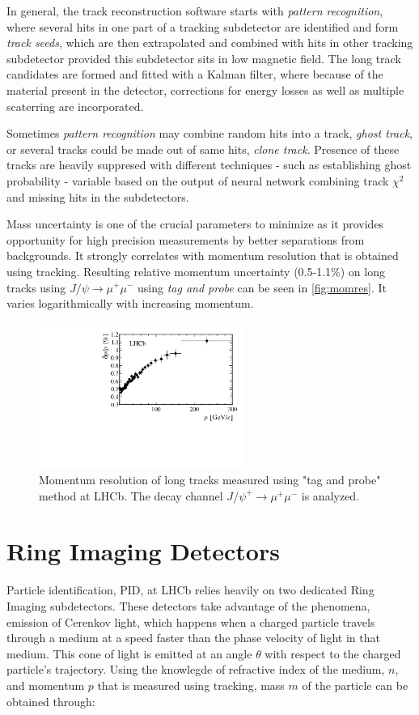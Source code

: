 In general, the track reconstruction software starts with \textit{pattern recognition}, where several hits in one part of a tracking subdetector are identified and form \textit{track seeds}, which are then extrapolated and combined with hits in other tracking subdetector provided this subdetector sits in low magnetic field. The long track candidates are formed and fitted with a Kalman filter\cite{Hierk:684697}, where because of the material present in the detector, corrections for energy losses as well as multiple scaterring are incorporated.

Sometimes \textit{pattern recognition} may combine random hits into a track, \textit{ghost track}, or several tracks could be made out of same hits, \textit{clone track}. Presence of these tracks are heavily suppresed with different techniques - such as establishing ghost probability - variable based on the output of neural network combining track $\chi^{2}$ and missing hits in the subdetectors.

Mass uncertainty is one of the crucial parameters to minimize as it provides opportunity for high precision measurements by better separations from backgrounds. It strongly correlates with momentum resolution that is obtained using tracking. Resulting relative momentum uncertainty (0.5-1.1\%) on long tracks using $J/\psi \rightarrow \mu^{+} \mu^{-}$ using \textit{tag and probe} can be seen in \autoref{fig:momres}. It varies logarithmically with increasing momentum.


\begin{figure}[!h]
	\centering
	\includegraphics[width = 0.6\textwidth]{figs/detector/momresolution.png}
	\caption{Momentum resolution of long tracks measured using "tag and probe" method at LHCb. The decay channel $J/\psi^{+} \rightarrow \mu^{+} \mu^{-}$ is analyzed.}
	\label{fig:momres}
\end{figure}

\section{Ring Imaging Detectors}
Particle identification, \Gls{PID}, at \Gls{LHCb} relies heavily on two dedicated Ring Imaging subdetectors. These detectors take advantage of the phenomena, emission of Cerenkov light, which happens when a charged particle travels through a medium at a speed faster than the phase velocity of light in that medium. This cone of light is emitted at an angle $\theta$ with respect to the charged particle's trajectory. Using the knowlegde of refractive index of the medium, $n$, and momentum $p$ that is measured using tracking, mass $m$ of the particle can be obtained through:

